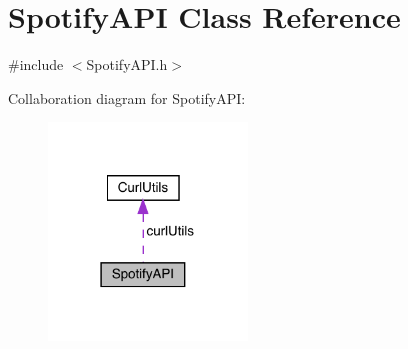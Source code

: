 \hypertarget{class_spotify_a_p_i}{}\section{Spotify\+A\+PI Class Reference}
\label{class_spotify_a_p_i}


{\ttfamily \#include $<$Spotify\+A\+P\+I.\+h$>$}



Collaboration diagram for Spotify\+A\+PI\+:
\nopagebreak
\begin{figure}[H]
\begin{center}
\leavevmode
\includegraphics[width=150pt]{class_spotify_a_p_i__coll__graph}
\end{center}
\end{figure}
